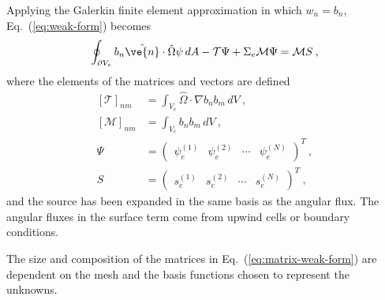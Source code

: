 \documentclass[12pt]{article}
\newcommand{\vOmega}{\ensuremath{\hat{\Omega}}}
\begin{document}
Applying the Galerkin finite element approximation in which $w_n=b_n$, 
Eq.~(\ref{eq:weak-form}) becomes
\begin{equation}
  \oint_{\partial V_e}b_n\hat{\ve{n}}\cdot\vOmega\psi\,dA -
  \mathcal{T}\Psi + \Sigma_e\mathcal{M}\Psi = \mathcal{M}S\:,
  \label{eq:matrix-weak-form}
\end{equation}
where the elements of the matrices and vectors are defined
\begin{equation}
  \begin{aligned}
    \left[\mathcal{T}\right]_{nm} &= \int_{V_e}\vOmega\cdot\nabla
    b_n b_m\,dV\:,\\
    \left[\mathcal{M}\right]_{nm} &= \int_{V_e}b_nb_m\,dV\:, \\
    \Psi &= \begin{pmatrix} \psi_e^{(1)} & \psi_e^{(2)} & \cdots &
      \psi_e^{(N)}
    \end{pmatrix}^T\:,\\
    S &= \begin{pmatrix} s_e^{(1)} & s_e^{(2)} & \cdots & s_e^{(N)}
    \end{pmatrix}^T\:,
  \end{aligned}
  \label{eq:weak_form_matrices}
\end{equation}
and the source has been expanded in the same basis as the angular flux.  The
angular fluxes in the surface term come from upwind cells or boundary
conditions.

The size and composition of the matrices in Eq.~(\ref{eq:matrix-weak-form})
are dependent on the mesh and the basis functions chosen to represent the
unknowns.  
\end{document}
